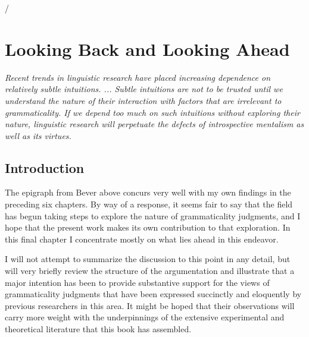 /\chapter{Looking Back and Looking Ahead}\label{sec:7}

 \epigraph{\itshape Recent trends in linguistic research have placed increasing dependence on relatively subtle intuitions. ... Subtle intuitions are not to be trusted until we understand the nature of their interaction with factors that are irrelevant to grammaticality. If we depend too much on such intuitions without exploring their nature, linguistic research will perpetuate the defects of introspective mentalism as well as its virtues.\\[-2\baselineskip]}{\citep{Bever1970b}}

 \section{Introduction}\label{sec:7.1}

 The epigraph from Bever above concurs very well with my own findings in the preceding six chapters. By way of a response, it seems fair to say that the field has begun taking steps to explore the nature of grammaticality judgments, and I hope that the present work makes its own contribution to that exploration. In this final chapter I concentrate mostly on what lies ahead in this endeavor.

 I will not attempt to summarize the discussion to this point in any detail, but will very briefly review the structure of the argumentation and illustrate that a major intention has been to provide substantive support for the views of grammaticality judgments that have been expressed succinctly and eloquently by previous researchers in this area. It might be hoped that their observations will carry more weight with the underpinnings of the extensive experimental and theoretical literature that this book has assembled.

